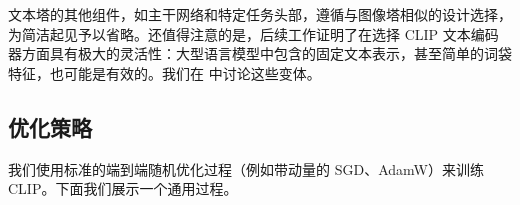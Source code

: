 \documentclass[../../book-main_zh.tex]{subfiles}
\begin{document}
文本塔的其他组件，如主干网络和特定任务头部，遵循与图像塔相似的设计选择，为简洁起见予以省略。还值得注意的是，后续工作证明了在选择 CLIP 文本编码器方面具有极大的灵活性：大型语言模型中包含的固定文本表示，甚至简单的词袋特征，也可能是有效的。我们在  中讨论这些变体。




\subsection{优化策略}
我们使用标准的端到端随机优化过程（例如带动量的 SGD、AdamW）来训练 CLIP。下面我们展示一个通用过程。
\end{document}
